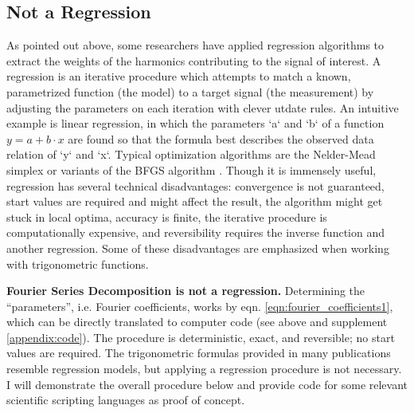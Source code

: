 \subsection{Not a Regression}
\label{sec:org656e3f7}
As pointed out above, some researchers have applied regression algorithms to extract the weights of the harmonics contributing to the signal of interest.
A regression is an iterative procedure which attempts to match a known, parametrized function (the model) to a target signal (the measurement) by adjusting the parameters on each iteration with clever utdate rules.
An intuitive example is linear regression, in which the parameters `a` and `b` of a function \(y=a+b\cdot x\) are found so that the formula best describes the observed data relation of `y` and `x`.
Typical optimization algorithms are the Nelder-Mead simplex \citep{Nelder1965} or variants of the BFGS algorithm \citep{Broyden1970,Fletcher1970,Goldfrab1970,Shanno1970,Zhu1997}.
Though it is immensely useful, regression has several technical disadvantages: convergence is not guaranteed, start values are required and might affect the result, the algorithm might get stuck in local optima, accuracy is finite, the iterative procedure is computationally expensive, and reversibility requires the inverse function and another regression.
Some of these disadvantages are emphasized when working with trigonometric functions.


\textbf{Fourier Series Decomposition is not a regression.}
Determining the ``parameters'', i.e. Fourier coefficients, works by eqn. \eqref{eqn:fourier_coefficients1}, which can be directly translated to computer code (see above and supplement \ref{appendix:code}).
The procedure is deterministic, exact, and reversible; no start values are required.
The trigonometric formulas provided in many publications resemble regression models, but applying a regression procedure is not necessary.
I will demonstrate the overall procedure below and provide code for some relevant scientific scripting languages as proof of concept.


